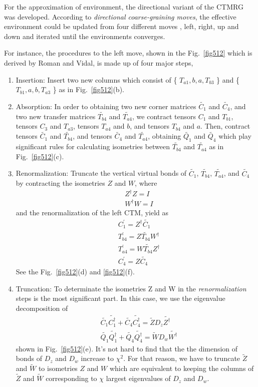 For the approximation of environment, the directional variant of the CTMRG was developed. According to \textit{directional coarse-graining moves}, the effective environment could be updated from four different moves , left, right, up and down and iterated until the environments converges. 

For instance, the procedures to the left move, shown in the Fig.~\ref{fig512} which is derived by Roman and Vidal, is made up of four major steps,
\begin{enumerate}
	\item Insertion: Insert two new columns which consist of \{ $T_{a1},b,a,T_{b3}$ \} and \{ $T_{b1},a,b,T_{a3}$ \} as in Fig.~\ref{fig512}(b).
	\item Absorption: In order to obtaining two new corner matrices $\tilde{C_1}$ and $\tilde{C_4}$, and two new transfer matrices $\tilde{T_{b4}}$ and $\tilde{T_{a4}}$, we contract tensors $C_1$ and $T_{b1}$, tensors $C_3$ and $T_{a3}$, tensors $T_{a4}$ and $b$, and tensors $T_{b4}$ and $a$. Then, contract tensors $\tilde{C_1}$ and $\tilde{T_{b4}}$, and tensors $\tilde{C_4}$ and $\tilde{T_{a4}}$, obtaining $\tilde{Q_1}$ and $\tilde{Q_4}$ which play significant rules for calculating isometries between $\tilde{T_{b4}}$ and $\tilde{T_{a4}}$ as in Fig.~\ref{fig512}(c).
	\item Renormalization: Truncate the vertical virtual bonds of $\widetilde{C_1}$, $\widetilde{T_{b4}}$, $\widetilde{T_{a4}}$, and $\widetilde{C_4}$ by contracting the isometries $Z$ and $W$, where
\begin{align}
	\label{isometry}
	&Z^{\dagger}Z = I \\
	&W^{\dagger}W = I
\end{align}
and the renormalization of the left CTM, yield as
\begin{align}
	\label{renormalize}
	&C^{\prime}_1 = Z^{\dagger} \tilde{C_1} \\
	&T_{b4}^{\prime} = Z\tilde{T_{b4}}W^{\dagger} \\
	&T_{a4}^{\prime} = W\tilde{T_{b4}}Z^{\dagger} \\
	&C^{\prime}_4 = Z\widetilde{C_4}
\end{align}
See the Fig.~\ref{fig512}(d) and \ref{fig512}(f).
	\item Truncation: To determinate the isometries Z and W in the \textit{renormalization} steps is the most significant part. In this case, we use the eigenvalue decomposition of 
		\begin{align}
			\label{eigh_ctm}
			&\tilde{C_1}\tilde{C^{\dagger}_1}+\tilde{C_4}\tilde{C^{\dagger}_4}= \tilde{Z} D_z \tilde{Z^{\dagger}}\\
			&\tilde{Q_1}\tilde{Q^{\dagger}_1}+\tilde{Q_4}\tilde{Q^{\dagger}_4}= \tilde{W} D_w \tilde{W^{\dagger}}
		\end{align}
		shown in Fig.~\ref{fig512}(e). It's not hard to find that the 
		the dimension of bonds of $D_z$ and $D_w$ increase to $\chi^2$. For that reason, we have to truncate $\tilde{Z}$ and $\tilde{W}$ to isometries $Z$ and $W$ which are equivalent to keeping the columns of $\tilde{Z}$ and $\tilde{W}$ corresponding to $\chi$ largest eigenvalues of $D_z$ and $D_w$.
\end{enumerate}

